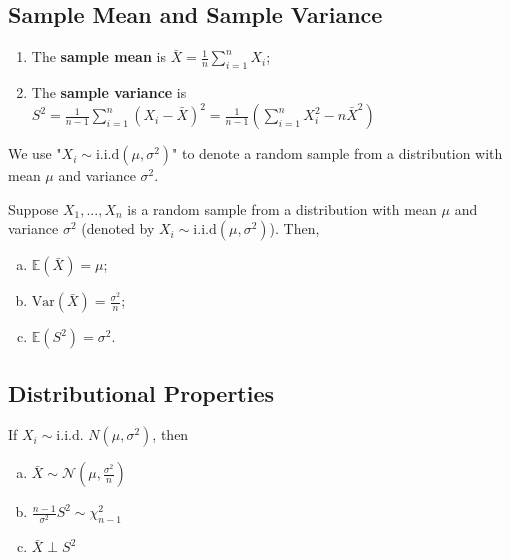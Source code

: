 \documentclass[11pt]{elegantbook}
\begin{document}
\subsection{Sample Mean and Sample Variance}
\begin{definition}
    \normalfont
    \begin{enumerate}
        \item The \textbf{sample mean} is $\bar{X}=\frac{1}{n}\sum_{i=1}^n X_i$;
        \item The \textbf{sample variance} is $S^2=\frac{1}{n-1}\sum_{i=1}^n (X_i-\bar{X})^2=\frac{1}{n-1}(\sum_{i=1}^n X_i^2 - n\bar{X}^2)$
    \end{enumerate}
\end{definition}

\begin{note}
    We use "$X_i\sim \text{i.i.d}(\mu,\sigma^2)$" to denote a random sample from a distribution with mean $\mu$ and variance $\sigma^2$.
\end{note}

\begin{theorem}
    Suppose $X_1,...,X_n$ is a random sample from a distribution with mean $\mu$ and variance $\sigma^2$ (denoted by $X_i\sim \text{i.i.d}(\mu,\sigma^2)$). Then,
    \begin{enumerate}[(a).]
        \item $\mathbb{E}(\bar{X})=\mu$;
        \item $\text{Var}(\bar{X})=\frac{\sigma^2}{n}$;
        \item $\mathbb{E}(S^2)=\sigma^2$.
    \end{enumerate}
\end{theorem}


\subsection{Distributional Properties}
\begin{theorem}
    If $X_i\sim \text{i.i.d. } N(\mu,\sigma^2)$, then
    \begin{enumerate}[(a).]
        \item $\bar{X}\sim \mathcal{N}(\mu,\frac{\sigma^2}{n})$
        \item $\frac{n-1}{\sigma^2}S^2\sim \chi^2_{n-1}$
        \item $\bar{X}\perp S^2$
    \end{enumerate}
\end{theorem}
\end{document}
